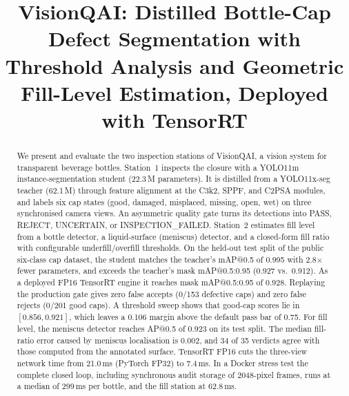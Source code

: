 \documentclass[conference]{IEEEtran}
\begin{document}
\title{VisionQAI: Distilled Bottle-Cap Defect Segmentation with Threshold Analysis and Geometric Fill-Level Estimation, Deployed with TensorRT}

\author{
}

\maketitle

\begin{abstract}
We present and evaluate the two inspection stations of VisionQAI, a vision system for transparent beverage bottles. Station~1 inspects the closure with a YOLO11m instance-segmentation student (22.3\,M parameters). It is distilled from a YOLO11x-seg teacher (62.1\,M) through feature alignment at the C3k2, SPPF, and C2PSA modules, and labels six cap states (good, damaged, misplaced, missing, open, wet) on three synchronised camera views. An asymmetric quality gate turns its detections into PASS, REJECT, UNCERTAIN, or INSPECTION\_FAILED. Station~2 estimates fill level from a bottle detector, a liquid-surface (meniscus) detector, and a closed-form fill ratio with configurable underfill/overfill thresholds. On the held-out test split of the public six-class cap dataset, the student matches the teacher's mAP@0.5 of 0.995 with 2.8$\times$ fewer parameters, and exceeds the teacher's mask mAP@0.5:0.95 (0.927 vs.\ 0.912). As a deployed FP16 TensorRT engine it reaches mask mAP@0.5:0.95 of 0.928. Replaying the production gate gives zero false accepts (0/153 defective caps) and zero false rejects (0/201 good caps). A threshold sweep shows that good-cap scores lie in $[0.856, 0.921]$, which leaves a 0.106 margin above the default pass bar of 0.75. For fill level, the meniscus detector reaches AP@0.5 of 0.923 on its test split. The median fill-ratio error caused by meniscus localisation is 0.002, and 34 of 35 verdicts agree with those computed from the annotated surface. TensorRT FP16 cuts the three-view network time from 21.0\,ms (PyTorch FP32) to 7.4\,ms. In a Docker stress test the complete closed loop, including synchronous audit storage of 2048-pixel frames, runs at a median of 299\,ms per bottle, and the fill station at 62.8\,ms.
\end{abstract}
\end{document}

